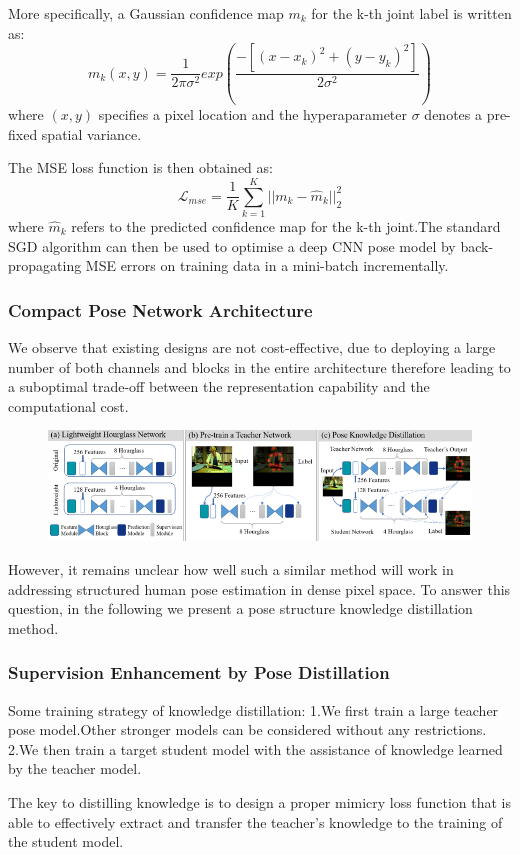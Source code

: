 \documentclass[11pt]{article}
\begin{document}
More specifically, a Gaussian confidence map $m_k$ for the k-th joint label is written as:
$$m_k(x,y)=\frac{1}{2\pi \sigma^2}exp(\frac{-[(x-x_k)^2+(y-y_k)^2]}{2\sigma^2})$$ 
where $(x,y)$ specifies a pixel location and the hyperaparameter $\sigma$ denotes a pre-fixed spatial variance.

The MSE loss function is then obtained as:
$$\mathcal{L}_{mse} = \frac{1}{K}\sum_{k=1}^{K}||m_k-\hat{m}_k||^2_2$$
where $\hat{m}_k$ refers to the predicted confidence map for the k-th joint.The standard SGD algorithm can then be used to optimise a deep CNN pose model by back-propagating MSE errors on training data in a mini-batch incrementally.

\subsubsection{Compact Pose Network Architecture}
We observe that existing designs are not cost-effective, due to deploying a large number of both channels and blocks in the entire architecture therefore leading to a suboptimal trade-off between the representation capability and the computational cost.

\begin{figure}[H]
	\centering
	\includegraphics[scale = 0.5]{72}
\end{figure}

However, it remains unclear how well such a similar method will work in addressing structured human pose estimation in dense pixel space. To answer this question, in the following we present a pose structure knowledge distillation method.
\subsubsection{Supervision Enhancement by Pose Distillation}
Some training strategy of knowledge distillation:
\noindent1.We first train a large teacher pose model.Other stronger models can be considered without any restrictions.
\noindent2.We then train a target student model with the assistance of knowledge learned by the teacher model.

The key to distilling knowledge is to design a proper mimicry loss function that is able to effectively extract and transfer the teacher’s knowledge to the training of the student model.
\end{document}
